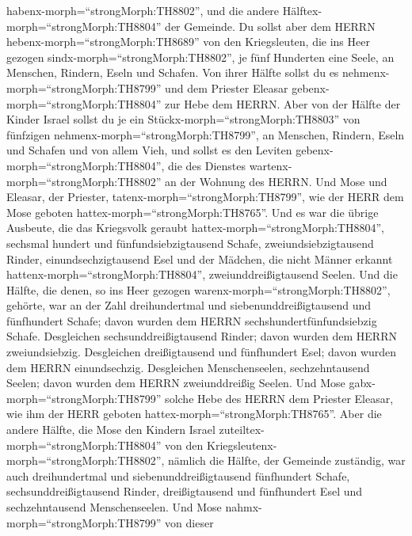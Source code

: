 habenx-morph=``strongMorph:TH8802'', und die andere
Hälftex-morph=``strongMorph:TH8804'' der Gemeinde.  Du
sollst aber dem HERRN hebenx-morph=``strongMorph:TH8689'' von den
Kriegsleuten, die ins Heer gezogen sindx-morph=``strongMorph:TH8802'',
je fünf Hunderten eine Seele, an Menschen, Rindern, Eseln und Schafen.
 Von ihrer Hälfte sollst du es
nehmenx-morph=``strongMorph:TH8799'' und dem Priester Eleasar
gebenx-morph=``strongMorph:TH8804'' zur Hebe dem HERRN. 
Aber von der Hälfte der Kinder Israel sollst du je ein
Stückx-morph=``strongMorph:TH8803'' von fünfzigen
nehmenx-morph=``strongMorph:TH8799'', an Menschen, Rindern, Eseln und
Schafen und von allem Vieh, und sollst es den Leviten
gebenx-morph=``strongMorph:TH8804'', die des Dienstes
wartenx-morph=``strongMorph:TH8802'' an der Wohnung des HERRN.
 Und Mose und Eleasar, der Priester,
tatenx-morph=``strongMorph:TH8799'', wie der HERR dem Mose geboten
hattex-morph=``strongMorph:TH8765''.  Und es war die übrige
Ausbeute, die das Kriegsvolk geraubt
hattex-morph=``strongMorph:TH8804'', sechsmal hundert und
fünfundsiebzigtausend Schafe,  zweiundsiebzigtausend
Rinder,  einundsechzigtausend Esel  und der
Mädchen, die nicht Männer erkannt hattenx-morph=``strongMorph:TH8804'',
zweiunddreißigtausend Seelen.  Und die Hälfte, die denen,
so ins Heer gezogen warenx-morph=``strongMorph:TH8802'', gehörte, war an
der Zahl dreihundertmal und siebenunddreißigtausend und fünfhundert
Schafe;  davon wurden dem HERRN sechshundertfünfundsiebzig
Schafe.  Desgleichen sechsunddreißigtausend Rinder; davon
wurden dem HERRN zweiundsiebzig.  Desgleichen
dreißigtausend und fünfhundert Esel; davon wurden dem HERRN
einundsechzig.  Desgleichen Menschenseelen, sechzehntausend
Seelen; davon wurden dem HERRN zweiunddreißig Seelen.  Und
Mose gabx-morph=``strongMorph:TH8799'' solche Hebe des HERRN dem
Priester Eleasar, wie ihm der HERR geboten
hattex-morph=``strongMorph:TH8765''.  Aber die andere
Hälfte, die Mose den Kindern Israel
zuteiltex-morph=``strongMorph:TH8804'' von den
Kriegsleutenx-morph=``strongMorph:TH8802'',  nämlich die
Hälfte, der Gemeinde zuständig, war auch dreihundertmal und
siebenunddreißigtausend fünfhundert Schafe, 
sechsunddreißigtausend Rinder,  dreißigtausend und
fünfhundert Esel  und sechzehntausend Menschenseelen.
 Und Mose nahmx-morph=``strongMorph:TH8799'' von dieser
